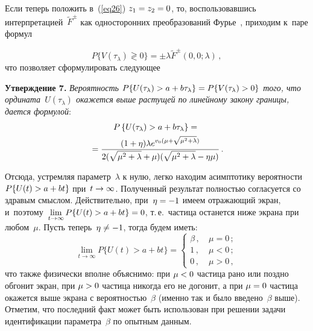 \begin{multicols}{2}
Если теперь положить в~(\ref{eq26}) $z_1\hm=z_2\hm=0$, то, воспользовавшись интерпретацией~$\tilde F^\pm$ как односторонних преобразований Фурье~\cite{ref15}, приходим к~паре формул

\noindent
\begin{equation*}
  P\{ V(\tau_\lambda) \gtrless 0  \} = \pm \lambda \tilde F^\pm(0,0;\lambda)\,,
\end{equation*}
что позволяет сформулировать следующее

\smallskip

\noindent
\textbf{Утверждение 7.}
\textit{Вероятность $P\{ U(\tau_\lambda) \hm> a +b \tau_\lambda\} \hm= P\{ V(\tau_\lambda) \hm> 0 \}$ того, что ордината~$U(\tau_\lambda)$ окажется выше растущей по линейному закону границы, дается формулой}:
  \begin{multline*}
    P\left\{ U(\tau_\lambda) > a +b \tau_\lambda\right\}={}\\
    {}=
    \displaystyle\frac{\displaystyle (1+\eta) \lambda e^{v_0( \mu +\sqrt{ \mu ^2+\lambda})}\mathstrut}{\displaystyle 2(\sqrt{ \mu ^2+\lambda}+ \mu )(\sqrt{ \mu^2+\lambda}-\eta  \mu )\mathstrut}\,.
  \end{multline*}


Отсюда, устремляя параметр~$\lambda$ к нулю, легко находим асимптотику вероятности~$P\{U(t)\hm > a \hm+ b t \}$ при~$t \hm\to \infty$. Полученный результат полностью согласуется со здравым смыслом. Действительно, при~$\eta \hm= -1$ имеем отражающий экран, и~поэтому~$\lim\limits_{t \to \infty}P\{ U(t) \hm> a \hm+ b t \} \hm= 0$, т.\,е.\ частица останется ниже экрана при любом~$\mu$. Пусть теперь~$\eta \hm\ne -1$, тогда будем иметь:
\begin{equation}
  \label{eq35}
  \lim\limits_{t \to \infty} P\{ U(t) > a + b t \}=\begin{cases}
\beta\,, &\ \mu=0\,;\\
1\,, &\ \mu<0\,;\\
0\,, &\ \mu>0\,,
\end{cases}
\end{equation}
что также физически вполне объяснимо: при $\mu\hm<0$ частица рано или поздно обгонит экран, при $\mu\hm>0$ частица никогда его не догонит, а при $\mu\hm=0$ частица окажется выше экрана с вероятностью~$\beta$ (именно так и было введено~$\beta$ выше). Отметим, что последний факт может быть использован при решении задачи идентификации параметра~$\beta$ по опытным данным.


\end{multicols}
